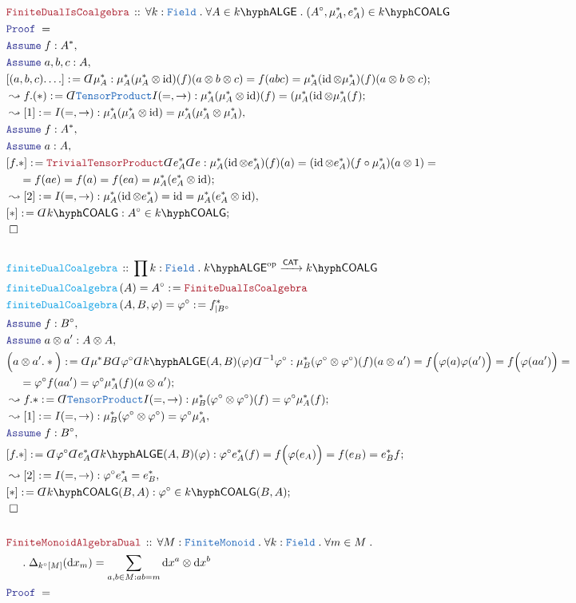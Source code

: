 \documentclass[12pt]{scrartcl}%
\newcommand{\TYPE}[1]{\textcolor{NavyBlue}{\mathtt{#1}}}%
\newcommand{\FUNC}[1]{\textcolor{Cerulean}{\mathtt{#1}}}%
\newcommand{\LOGIC}[1]{\textcolor{Blue}{\mathtt{#1}}}%
\newcommand{\THM}[1]{\textcolor{Maroon}{\mathtt{#1}}}%
\renewcommand{\.}{\; . \;} %
\newcommand{\de}{: \kern 0.1pc =} %
\newcommand{\Act}[1]{\left( #1 \right)} %
\newcommand{\Theorem}[2]{& \THM{#1} \, :: \, #2 \\ & \Proof = \\ } %
\newcommand{\DeclareFunc}[2]{& \FUNC{#1} \, :: \, #2 \\}%
\newcommand{\DefineNamedFunc}[4]{&  \FUNC{#1}\Act{#2} = #3 \de #4 \\}%
\newcommand{\NewLine}{\\ & \kern 1pc}%
\newcommand{\Page}[1]{ \begin{align*} #1 \end{align*}  }%
\newcommand{ \bd }{ \ByDef }%
\DeclareMathOperator*{\id}{id}%
\newcommand{\Conclude}[3]{& #1 \de #2 : #3; \\}%
\newcommand{\Derive}[3]{& \leadsto #1 \de #2 : #3, \\} %
\newcommand{\DeriveConclude}[3]{& \leadsto #1 \de #2 : #3 ; \\} %
\newcommand{\Assume}[2]{& \LOGIC{Assume} \; #1 : #2, \\} %
\newcommand{\QED}{\; \square} %
\newcommand{\EndProof}{& \QED \\} %
\newcommand{\ByDef}{\rotatebox[origin=c]{-180}{$D$}}%
\newcommand{\Proof}{\LOGIC{Proof} \; } %
\newcommand{\Arrow}[1]{\xrightarrow{#1}}%
\newcommand{\CAT}{\mathsf{CAT}} %
\newcommand{\Field}{\TYPE{Field}}
\newcommand{\LALGE}[1]{#1\hyph\mathsf{ALGE}}%
\newcommand{\COALG}[1]{#1\hyph\mathsf{COALG}}%
\begin{document}
\Page{
	\Theorem{FiniteDualIsCoalgebra}
	{
		\forall k : \Field \.
		\forall A \in \LALGE{k} \.
		(A^\circ, \mu_A^*, e_A^* ) \in \COALG{k}                                                                          
	}
	\Assume{f}{A^*}
	\Assume{a,b,c}{A}
	\Conclude{[(a,b,c).\ldots]}{\bd \mu^*_A}{  \mu_A^* (\mu_A^* \otimes \id)(f)(a \otimes b \otimes c) = f(abc)  = \mu_A^* (\id \otimes \mu_A^*)(f)(a \otimes b \otimes c) }
	\DeriveConclude{f.(*)}{\bd \TYPE{TensorProduct}I(=,\to)}{\mu_A^* (\mu_A^* \otimes \id)(f)  = (\mu_A^* ( \id \otimes \mu_A^*(f) }
	\Derive{[1]}{I(=,\to)}{ \mu_A^* (\mu_A^* \otimes \id) = \mu_A^*(\mu_A^* \otimes \mu_A^*)}
	\Assume{f}{A^*}
	\Assume{a}{A}
	\Conclude{[f.*]}{\THM{TrivialTensorProduct} \bd e_A^* \bd e}{  
		\mu^*_A(\id \otimes e_A^*) (f)(a) = 
		(\id \otimes e_A^*) (f \circ \mu_A^*) (a \otimes 1)  = \NewLine =  
		f( a e ) = f(a) = f(ea) = 
		\mu^*_A(e_A^* \otimes \id)
	}
	\Derive{[2]}{ I(=,\to) }{ \mu^*_A(\id \otimes e_A^*) = \id = \mu^*_A(e_A^* \otimes \id)  }
	\Conclude{[*]}{\bd \COALG{k}}{ A^\circ \in \COALG{k}} 
	\EndProof
	\\
	\DeclareFunc{finiteDualCoalgebra}
	{
		\prod k : \Field \.
		\LALGE{k}^{\mathrm{op}} \Arrow{\CAT} \COALG{k}
	}
	\DefineNamedFunc{finiteDualCoalgebra}{A}{A^\circ}{\THM{FiniteDualIsCoalgebra}}
	\DefineNamedFunc{finiteDualCoalgebra}{A,B,\varphi}{\varphi^\circ}{f^*_{|B^\circ}}
	\Assume{f}{B^\circ}
	\Assume{a \otimes a' }{A \otimes A}
	\Conclude{\Big( a \otimes a'.*\Big)}{\bd \mu^*B \bd \varphi^\circ \bd \LALGE{k}(A,B)(\varphi)\bd^{-1}\varphi^\circ }{ 
			\mu^*_B(\varphi^\circ \otimes \varphi^\circ) (f) (a \otimes a') = 
			f\Big( \varphi(a)\varphi(a') \Big) =
			f\Big( \varphi(aa')  \Big) = \NewLine = 
			\varphi^\circ f (aa') = 
			\varphi^\circ \mu^*_A (f) (a \otimes a') } 
	\DeriveConclude{f.*}{\bd \TYPE{TensorProduct}I(=,\to)}{  \mu^*_B (\varphi^\circ \otimes \varphi^\circ)(f) = \varphi^\circ \mu^*_A(f)  }  
	\Derive{[1]}{  I(=,\to)  }{ \mu^*_B (\varphi^\circ \otimes \varphi^\circ) = \varphi^\circ \mu^*_A  }
	\Assume{f}{B^\circ}
	\Conclude{[f.*]}{\bd \varphi^\circ \bd e^*_A \bd \LALGE{k}(A,B)(\varphi)}{  \varphi^\circ e^*_A (f) = f\Big(\varphi(e_A)\Big) = f(e_B) = e^*_B f  }
	\Derive{[2]}{I(=,\to)}{ \varphi^\circ e^*_A = e^*_B  }   
	\Conclude{[*]}{\bd \COALG{k}(B,A)}{\varphi^\circ \in \COALG{k}(B,A)} 
	\EndProof
	\\
	\Theorem{FiniteMonoidAlgebraDual}{
		\forall M : \TYPE{FiniteMonoid} \. 
		\forall k : \TYPE{Field} \.
		\forall m \in M \. \NewLine \. 
		\Delta_{k^\circ[M]}(\mathrm{d}x_m) = \sum_{a,b \in M : ab = m}  \mathrm{d}x^a \otimes \mathrm{d}x^b
}}
\end{document}
